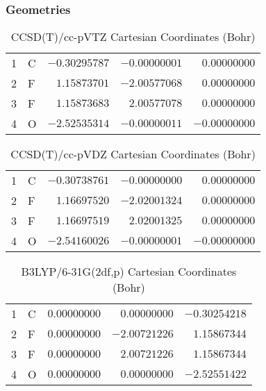 \documentclass[10pt,oneside]{article}
\begin{document}
\clearpage

\subsection{\ \ \ }

\subsubsection*{Geometries}
\begin{table}[h!]
\centering
\caption{CCSD(T)/cc-pVTZ Cartesian Coordinates (Bohr)}
\begin{tabular}{llrrr}
1  & C  & $-0.30295787$ & $-0.00000001$ & $ 0.00000000$ \\
2  & F  & $ 1.15873701$ & $-2.00577068$ & $ 0.00000000$ \\
3  & F  & $ 1.15873683$ & $ 2.00577078$ & $ 0.00000000$ \\
4  & O  & $-2.52535314$ & $-0.00000011$ & $-0.00000000$ \\
\end{tabular}
\end{table}

\begin{table}[h!]
\centering
\caption{CCSD(T)/cc-pVDZ Cartesian Coordinates (Bohr)}
\begin{tabular}{llrrr}
1  & C  & $-0.30738761$ & $-0.00000000$ & $ 0.00000000$ \\
2  & F  & $ 1.16697520$ & $-2.02001324$ & $ 0.00000000$ \\
3  & F  & $ 1.16697519$ & $ 2.02001325$ & $ 0.00000000$ \\
4  & O  & $-2.54160026$ & $-0.00000001$ & $-0.00000000$ \\
\end{tabular}
\end{table}

\begin{table}[h!]
\centering
\caption{B3LYP/6-31G(2df,p) Cartesian Coordinates (Bohr)}
\begin{tabular}{llrrr}
1  & C  & $ 0.00000000$ & $ 0.00000000$ & $-0.30254218$ \\
2  & F  & $ 0.00000000$ & $-2.00721226$ & $ 1.15867344$ \\
3  & F  & $ 0.00000000$ & $ 2.00721226$ & $ 1.15867344$ \\
4  & O  & $ 0.00000000$ & $ 0.00000000$ & $-2.52551422$ \\
\end{tabular}
\end{table}
\end{document}
